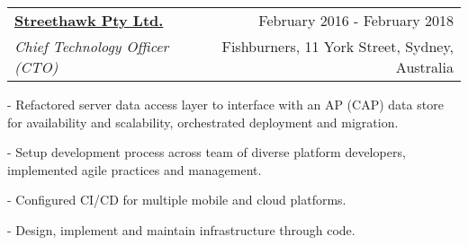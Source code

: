 \documentclass[10pt]{article}
\makeatletter
\newcommand{\employer}[4]{ 
        \vspace*{6pt}
	\begin{tabular*}{\textwidth}{l@{\extracolsep{\fill}}r}
	\textbf{#1} & #2 \\
                #3  & #4 \\ 
	\end{tabular*}
}
\newenvironment{achievements}{
        \vspace{-0pt}
        \begin{list}
        {}
        {\topsep 0pt \itemsep -3pt}
}
{
        \end{list}
}
\makeatother
\begin{document}
\employer{\href{http://www.streethawk.com/}{Streethawk Pty Ltd.}}{February 2016 - February 2018}{\emph{Chief Technology Officer (CTO)}} {Fishburners, 11 York Street, Sydney, Australia}
	\begin{achievements}
                \item[-] Refactored server data access layer to interface with an AP (CAP) data store for availability and scalability, orchestrated deployment and migration.
                \item[-] Setup development process across team of diverse platform developers, implemented agile practices and management.
                \item[-] Configured CI/CD for multiple mobile and cloud platforms.
                \item[-] Design, implement and maintain infrastructure through code.
    \end{achievements}
\end{document}
